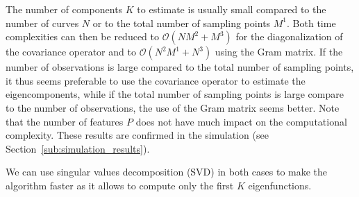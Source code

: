 The number of components $K$ to estimate is usually small compared to the number of curves $N$ or to the total number of sampling points $M^1$. Both time complexities can then be reduced to $\mathcal{O}(NM^2 + M^3)$ for the diagonalization of the covariance operator and to $\mathcal{O}(N^2M^1 + N^3)$ using the Gram matrix. If the number of observations is large compared to the total number of sampling points, it thus seems preferable to use the covariance operator to estimate the eigencomponents, while if the total number of sampling points is large compare to the number of observations, the use of the Gram matrix seems better. Note that the number of features $P$ does not have much impact on the computational complexity. These results are confirmed in the simulation (see Section~\ref{sub:simulation_results}).

\begin{remark}
We can use singular values decomposition (SVD) in both cases to make the algorithm faster as it allows to compute only the first $K$ eigenfunctions.
\end{remark}


